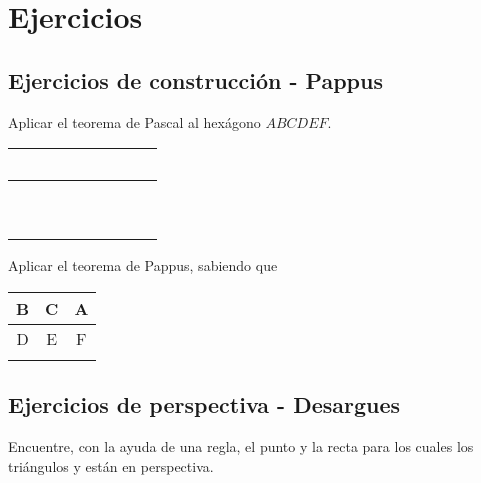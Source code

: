 \section{Ejercicios}

\subsection{Ejercicios de construcción - Pappus}

\begin{section-exercise}
    Aplicar el teorema de Pascal al hexágono $ABCDEF$. \hspace{1cm}
    \begin{tabular}{|c|c|c|}
        \hline
        \ \ \ \ && \\\hline
        &\ \ \ \ & \\\hline\hline
        &&\ \ \ \ \\\hline
    \end{tabular}
    \vspace*{\fill}
    \begin{figure}[H]
        \centering
        
    \end{figure}
    \vspace*{\fill}
\end{section-exercise}

\newpage
\begin{section-exercise}
    Aplicar el teorema de Pappus, sabiendo que
    \begin{tabular}{|c|c|c|}
        \hline
        B & C & A\\\hline
        D & E & F\\
        \hline \hline
        &&\\
        \hline
    \end{tabular}
    \vspace*{\fill}
    \begin{figure}[H]
        \centering
        
    \end{figure}
    \vspace*{\fill}
\end{section-exercise}




\newpage
\subsection{Ejercicios de perspectiva - Desargues}

\begin{section-exercise}
    Encuentre, con la ayuda de una regla, el punto y la recta para los cuales los triángulos  y  están en perspectiva.

    \vspace*{\fill}
    \begin{figure}[H]
        \centering
        
    \end{figure}
    \vspace*{\fill}
\end{section-exercise}

